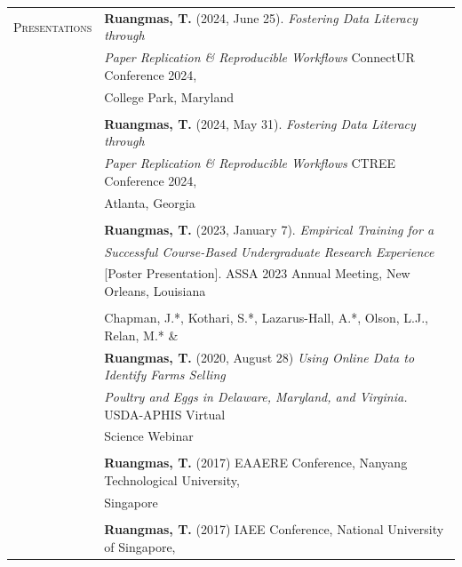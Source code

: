 \documentclass[letterpaper,11pt,oneside]{article}\usepackage[]{graphicx}\usepackage[]{xcolor}
\begin{document}
\newpage
\noindent \begin{tabular}{p{1.2in} l}                           
\textsc{Presentations} & \textbf{Ruangmas, T.} (2024, June 25). \textit{Fostering Data Literacy through} \\
                        & \textit{Paper Replication \& Reproducible Workflows} ConnectUR Conference 2024, \\
                        & College Park, Maryland  \href{https://drive.google.com/file/d/1sWazDSKhvuPo2vBjK3psZ5JWO0LkyMRQ/view?usp=drive_link}{\color{blue}{[Slides]}}\\
                        & \\
                        & \textbf{Ruangmas, T.} (2024, May 31). \textit{Fostering Data Literacy through}\\
                        & \textit{Paper Replication \& Reproducible Workflows} CTREE Conference 2024, \\
                        & Atlanta, Georgia\\
                        & \\
                        & \textbf{Ruangmas, T.} (2023, January 7). \textit{Empirical Training for a }\\
                        & \textit{Successful Course-Based Undergraduate Research Experience} \\
                        & [Poster Presentation]. ASSA 2023 Annual Meeting, New Orleans, Louisiana\\
                        & \\
                        & Chapman, J.*, Kothari, S.*, Lazarus-Hall, A.*, Olson, L.J., Relan, M.* \& \\
                        & \textbf{Ruangmas, T.} (2020, August 28) \textit{Using Online Data to Identify Farms Selling}\\
                        & \textit{Poultry and Eggs in Delaware, Maryland, and Virginia.} USDA-APHIS Virtual\\
                        & Science Webinar\\
	                      & \\
                        & \textbf{Ruangmas, T.} (2017) EAAERE Conference, Nanyang Technological University, \\
                        & Singapore \\
	                      & \\
                        & \textbf{Ruangmas, T.} (2017) IAEE Conference, National University of Singapore, \\

\end{tabular}
\end{document}
